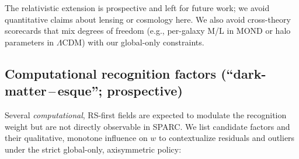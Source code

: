 \documentclass[fleqn,usenatbib]{mnras}
\begin{document}
The relativistic extension is prospective and left for future work; we avoid quantitative claims about lensing or cosmology here. We also avoid cross-theory scorecards that mix degrees of freedom (e.g., per-galaxy M/L in MOND or halo parameters in $\Lambda$CDM) with our global-only constraints.

\subsection{Computational recognition factors (``dark-matter\,--\,esque''; prospective)}
\label{subsec:computational-factors}

\noindent Several \emph{computational}, RS-first fields are expected to modulate the recognition weight but are not directly observable in SPARC. We list candidate factors and their qualitative, monotone influence on $w$ to contextualize residuals and outliers under the strict global-only, axisymmetric policy:
\end{document}
